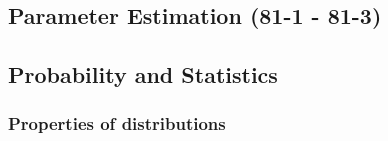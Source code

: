 \documentclass{report}
\begin{document}
\subsection{Parameter Estimation (81-1 - 81-3)}
\subsection{Probability and Statistics}
\subsubsection{Properties of distributions}
 


\newpage








\newpage

\printindex
\end{document}
